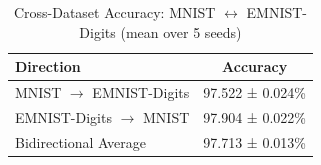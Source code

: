 
\begin{table}[h]
\centering
\caption{Cross-Dataset Accuracy: MNIST $\leftrightarrow$ EMNIST-Digits (mean over 5 seeds)}
\label{tab:extension_cross_dataset_mnist_emnist_digits}
\begin{tabular}{lc}
\toprule
\textbf{Direction} & \textbf{Accuracy} \\
\midrule
MNIST $\rightarrow$ EMNIST-Digits & 97.522 ± 0.024\% \\
EMNIST-Digits $\rightarrow$ MNIST & 97.904 ± 0.022\% \\
\midrule
Bidirectional Average & 97.713 ± 0.013\% \\
\bottomrule
\end{tabular}
\end{table}
